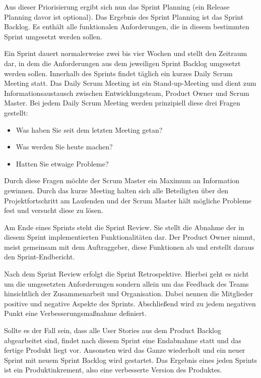Aus dieser Priorisierung ergibt sich nun das Sprint Planning (ein Release Planning davor ist optional). Das Ergebnis des Sprint Planning ist das Sprint Backlog. Es enthält alle funktionalen Anforderungen, die in diesem bestimmten Sprint umgesetzt werden sollen. \cite{SCRUM}

Ein Sprint dauert normalerweise zwei bis vier Wochen und stellt den Zeitraum dar, in dem die Anforderungen aus dem jeweiligen Sprint Backlog umgesetzt werden sollen. Innerhalb des Sprints findet täglich ein kurzes Daily Scrum Meeting statt. Das Daily Scrum Meeting ist ein Stand-up-Meeting und dient zum Informationsaustausch zwischen Entwicklungsteam, Product Owner und Scrum Master. Bei jedem Daily Scrum Meeting werden prinzipiell diese drei Fragen gestellt:
\begin{itemize}
\item Was haben Sie seit dem letzten Meeting getan?
\item Was werden Sie heute machen?
\item Hatten Sie etwaige Probleme?
\end{itemize}
\cite{SCRUM}

Durch diese Fragen möchte der Scrum Master ein Maximum an Information gewinnen. Durch das kurze Meeting halten sich alle Beteiligten über den Projektfortschritt am Laufenden und der Scrum Master hält mögliche Probleme fest und versucht diese zu lösen.

Am Ende eines Sprints steht die Sprint Review. Sie stellt die Abnahme der in diesem Sprint implementierten Funktionalitäten dar. Der Product Owner nimmt, meist gemeinsam mit dem Auftraggeber, diese Funktionen ab und erstellt daraus den Sprint-Endbericht. \cite{SCRUM}

\newpage

Nach dem Sprint Review erfolgt die Sprint Retrospektive. Hierbei geht es nicht um die umgesetzten Anforderungen sondern allein um das Feedback des Teams hinsichtlich der Zusammenarbeit und Organisation. Dabei nennen die Mitglieder positive und negative Aspekte des Sprints. Abschließend wird zu jedem negativen Punkt eine Verbesserungsmaßnahme definiert. \cite{SCRUM}

Sollte es der Fall sein, dass alle User Stories aus dem Product Backlog abgearbeitet sind, findet nach diesem Sprint eine Endabnahme statt und das fertige Produkt liegt vor. Ansonsten wird das Ganze wiederholt und ein neuer Sprint mit neuem Sprint Backlog wird gestartet. Das Ergebnis eines jeden Sprints ist ein Produktinkrement, also eine verbesserte Version des Produktes. \cite{SCRUM}

